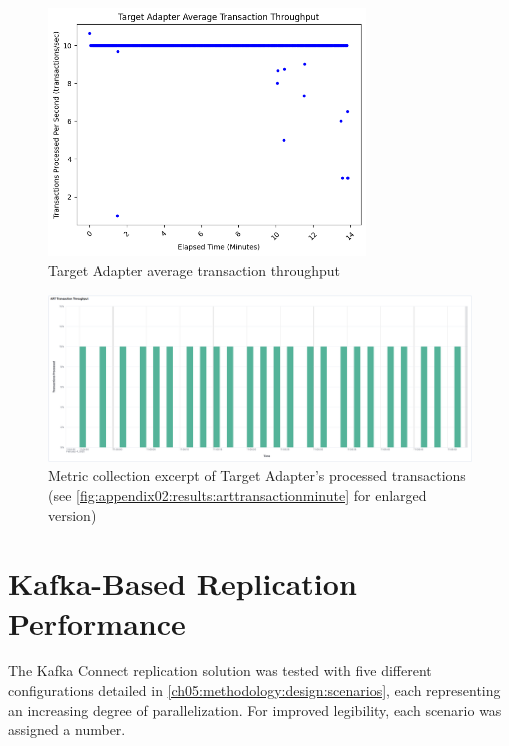 \begin{figure}[htbp]
    \centering
    \includegraphics[width=0.75\textwidth]{chapters/images/art-performance/art-avg-transaction-throughput.png}
    \caption{Target Adapter average transaction throughput}
    \label{fig:chapter06:results:artavgtransaction}
\end{figure}

\begin{figure}[htbp]
    \centering
    \includegraphics[width=1\textwidth]{chapters/images/art-performance/art-transaction-throughput-minute.png}
    \caption[Metric collection excerpt of Target Adapter's processed transactions]{Metric collection excerpt of Target Adapter's processed transactions (see \ref{fig:appendix02:results:arttransactionminute} for enlarged version)}
    \label{fig:chapter06:results:arttransactionminute}
\end{figure}

\section{Kafka-Based Replication Performance}
\label{ch06:results:artperformance}
The Kafka Connect replication solution was tested with five different configurations detailed in \ref{ch05:methodology:design:scenarios}, each representing an increasing degree of parallelization. For improved legibility, each scenario was assigned a number.

